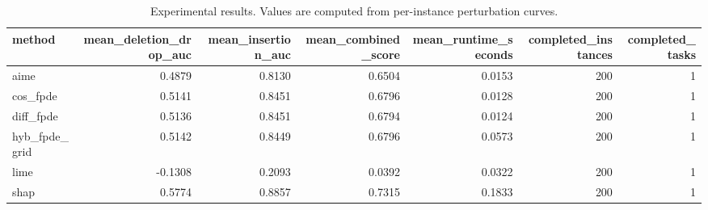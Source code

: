 \begin{table}[t]
\caption{Experimental results. Values are computed from per-instance perturbation curves.}
\label{tab:main_results_computed}
\centering
\begin{tabular}{lrrrrrr}
\toprule
method & mean\_deletion\_drop\_auc & mean\_insertion\_auc & mean\_combined\_score & mean\_runtime\_seconds & completed\_instances & completed\_tasks \\
\midrule
aime & 0.4879 & 0.8130 & 0.6504 & 0.0153 & 200 & 1 \\
cos\_fpde & 0.5141 & 0.8451 & 0.6796 & 0.0128 & 200 & 1 \\
diff\_fpde & 0.5136 & 0.8451 & 0.6794 & 0.0124 & 200 & 1 \\
hyb\_fpde\_grid & 0.5142 & 0.8449 & 0.6796 & 0.0573 & 200 & 1 \\
lime & -0.1308 & 0.2093 & 0.0392 & 0.0322 & 200 & 1 \\
shap & 0.5774 & 0.8857 & 0.7315 & 0.1833 & 200 & 1 \\
\bottomrule
\end{tabular}

\end{table}
